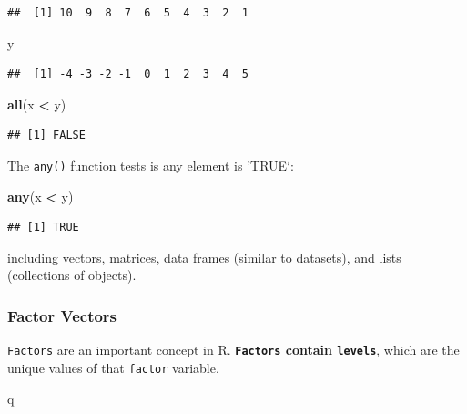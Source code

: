 \documentclass[]{book}
\newenvironment{Shaded}{\begin{snugshade}}{\end{snugshade}}
\newcommand{\KeywordTok}[1]{\textcolor[rgb]{0.13,0.29,0.53}{\textbf{#1}}}
\newcommand{\NormalTok}[1]{#1}
\newcommand{\OperatorTok}[1]{\textcolor[rgb]{0.81,0.36,0.00}{\textbf{#1}}}
\newcommand{\StringTok}[1]{\textcolor[rgb]{0.31,0.60,0.02}{#1}}
\theoremstyle{definition}
\theoremstyle{definition}
\theoremstyle{definition}
\theoremstyle{remark}
\begin{document}
\begin{verbatim}
##  [1] 10  9  8  7  6  5  4  3  2  1
\end{verbatim}

\begin{Shaded}
\begin{Highlighting}[]
\NormalTok{y}
\end{Highlighting}
\end{Shaded}

\begin{verbatim}
##  [1] -4 -3 -2 -1  0  1  2  3  4  5
\end{verbatim}

\begin{Shaded}
\begin{Highlighting}[]
\KeywordTok{all}\NormalTok{(x }\OperatorTok{<}\StringTok{ }\NormalTok{y)}
\end{Highlighting}
\end{Shaded}

\begin{verbatim}
## [1] FALSE
\end{verbatim}

The \texttt{any()} function tests is any element is 'TRUE`:

\begin{Shaded}
\begin{Highlighting}[]
\KeywordTok{any}\NormalTok{(x }\OperatorTok{<}\StringTok{ }\NormalTok{y)}
\end{Highlighting}
\end{Shaded}

\begin{verbatim}
## [1] TRUE
\end{verbatim}

including vectors, matrices, data frames (similar to datasets), and
lists (collections of objects).

\hypertarget{factor-vectors}{%
\subsubsection{Factor Vectors}\label{factor-vectors}}

\texttt{Factors} are an important concept in R. \textbf{\texttt{Factors}
contain \texttt{levels}}, which are the unique values of that
\texttt{factor} variable.

\begin{Shaded}
\begin{Highlighting}[]
\NormalTok{q}
\end{Highlighting}
\end{Shaded}
\end{document}
